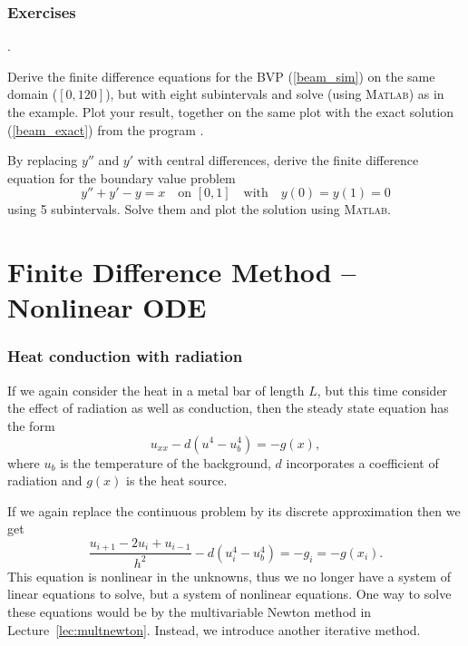 \newpage
\subsection*{Exercises}

\begin{list}
{.}{}

\item Derive the finite difference equations for the BVP
  (\ref{beam_sim}) on the same domain ($[0,120]$), but with eight
  subintervals and solve (using \textsc{Matlab}) as in the example.
  Plot your result, together on the same plot with the exact solution
  (\ref{beam_exact}) from the program .


\item By replacing $y''$ and $y'$ with central differences, derive the
  finite difference equation for the boundary value problem
  $$
  y'' + y' - y = x\quad\text{on $[0,1]$}  \quad\text{with}\quad y(0) = y(1) = 0
  $$
  using 5 subintervals. Solve them and plot the solution using \textsc{Matlab}.
  
  

\end{list}



\chapter{Finite Difference Method -- Nonlinear ODE}


\subsection*{Heat conduction with radiation}

If we again consider the heat in a metal bar of length $L$, but
this time consider the effect of radiation as well
as conduction, then the steady state equation has the form
\begin{equation}
    u_{xx} - d (u^4 - u_b^4) = - g(x),
\end{equation}
where $u_b$ is the temperature of the background, $d$ incorporates a
coefficient of radiation and $g(x)$ is the heat source.

If we again replace the continuous problem by its discrete approximation
then we get
\begin{equation}\label{condrad}
 \frac{u_{i+1} - 2 u_i + u_{i-1}}{h^2} - d(u_i^4 - u_b^4) = - g_i = -g(x_i).
\end{equation}
This equation is nonlinear in the unknowns, thus we no longer have
a system of linear equations to solve, but a system of nonlinear
equations. One way to solve these equations would be by
the multivariable Newton method in Lecture~\ref{lec:multnewton}. Instead, we introduce another iterative
method.


